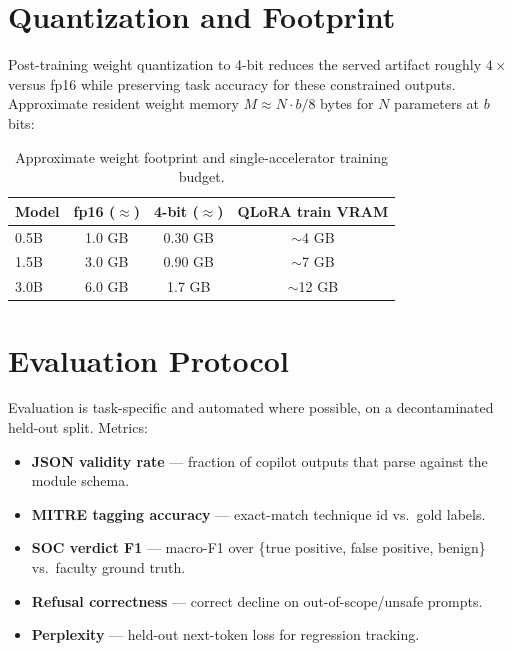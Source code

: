 \documentclass[11pt,a4paper]{article}
\begin{document}
\section{Quantization and Footprint}
Post-training weight quantization to 4-bit reduces the served artifact roughly
$4\times$ versus fp16 while preserving task accuracy for these constrained
outputs. Approximate resident weight memory $M \approx N \cdot b / 8$ bytes for
$N$ parameters at $b$ bits:

\begin{table}[h]
\centering\small
\begin{tabular}{@{}lccc@{}}
\toprule
\textbf{Model} & \textbf{fp16 ($\approx$)} & \textbf{4-bit ($\approx$)} & \textbf{QLoRA train VRAM}\\
\midrule
0.5B & 1.0 GB & 0.30 GB & $\sim$4 GB\\
1.5B & 3.0 GB & 0.90 GB & $\sim$7 GB\\
3.0B & 6.0 GB & 1.7 GB  & $\sim$12 GB\\
\bottomrule
\end{tabular}
\caption{Approximate weight footprint and single-accelerator training budget.}
\end{table}

\section{Evaluation Protocol}
Evaluation is task-specific and automated where possible, on a decontaminated
held-out split. Metrics:
\begin{itemize}[leftmargin=*]
  \item \textbf{JSON validity rate} --- fraction of copilot outputs that parse against the module schema.
  \item \textbf{MITRE tagging accuracy} --- exact-match technique id vs.\ gold labels.
  \item \textbf{SOC verdict F1} --- macro-F1 over \{true positive, false positive, benign\} vs.\ faculty ground truth.
  \item \textbf{Refusal correctness} --- correct decline on out-of-scope/unsafe prompts.
  \item \textbf{Perplexity} --- held-out next-token loss for regression tracking.
\end{itemize}
\end{document}
